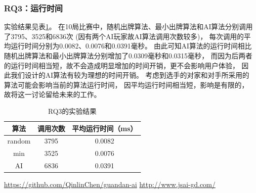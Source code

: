 \documentclass[a4paper]{ctexart}
\begin{document}
\subsubsection{RQ3：运行时间}
实验结果见表\ref{RQ3_result}。
在10局比赛中，随机出牌算法、最小出牌算法和AI算法分别调用了3795、3525和6836次
(因有两个AI玩家故AI算法调用次数较多)，
每次调用的平均运行时间分别为0.0082、0.0076和0.0391毫秒。
由此可知AI算法的运行时间相比随机出牌算法和最小出牌算法分别增加了0.0309毫秒和0.0315毫秒，
而因为后两者的运行时间相当短，故不会造成明显增加的时间开销，更不会影响用户体验，
因此我们设计的AI算法有较为理想的时间开销。
考虑到选手的对家和对手所采用的算法可能会影响当前的算法运行时间，
因平均运行时间相当短，影响是有限的，故将这一讨论留给未来的工作。

\begin{table}
  \centering
  \caption{RQ3的实验结果}
  \label{RQ3_result}
  \begin{tabular}{|c|c|c|}
    \hline
    算法 & 调用次数 & 平均运行时间（ms） \\ \hline
    random & 3795 & 0.0082 \\ \hline
    min & 3525 & 0.0076 \\ \hline
    AI & 6836 & 0.0391 \\ \hline
  \end{tabular}
\end{table}

\begin{thebibliography}{99}
  \url{https://github.com/QinlinChen/guandan-ai}
  \url{http://www.jsai-gd.com/}
\end{thebibliography}
\end{document}
